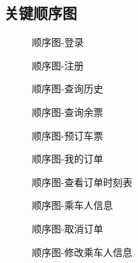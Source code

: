 \documentclass{article}
\begin{document}
		\subsection{关键顺序图}
			\begin{figure}[H]
				\centering
				
				\caption{顺序图-登录}
				\label{顺序图-登录}
			\end{figure}
			\begin{figure}[H]
				\centering
				
				\caption{顺序图-注册}
				\label{顺序图-注册}
			\end{figure}
			\begin{figure}[H]
				\centering
				
				\caption{顺序图-查询历史}
				\label{顺序图-查询历史}
			\end{figure}
			\begin{figure}[H]
				\centering
				
				\caption{顺序图-查询余票}
				\label{顺序图-查询余票}
			\end{figure}
			\begin{figure}[H]
				\centering
				
				\caption{顺序图-预订车票}
				\label{顺序图-预订车票}
			\end{figure}
			\begin{figure}[H]
				\centering
				
				\caption{顺序图-我的订单}
				\label{顺序图-我的订单}
			\end{figure}
			\begin{figure}[H]
				\centering
				
				\caption{顺序图-查看订单时刻表}
				\label{顺序图-查看订单时刻表}
			\end{figure}
			\begin{figure}[H]
				\centering
				
				\caption{顺序图-乘车人信息}
				\label{顺序图-乘车人信息}
			\end{figure}
			\begin{figure}[H]
				\centering
				
				\caption{顺序图-取消订单}
				\label{顺序图-取消订单}
			\end{figure}
			\begin{figure}[H]
				\centering
				
				\caption{顺序图-修改乘车人信息}
				\label{顺序图-修改乘车人信息}
			\end{figure}
\end{document}
